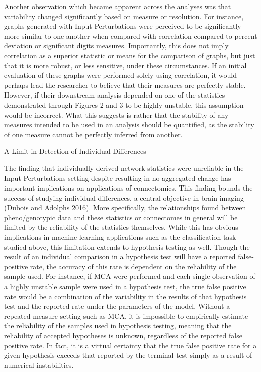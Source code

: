 \documentclass[fleqn,10pt]{SelfArx} %
\begin{document}
Another observation which became apparent across the analyses was that variability changed significantly based on measure or resolution. For instance, graphs generated with Input Perturbations were perceived to be significantly more similar to one another when compared with correlation compared to percent deviation or significant digits measures. Importantly, this does not imply correlation as a superior statistic or means for the comparison of graphs, but just that it is more robust, or less sensitive, under these circumstances. If an initial evaluation of these graphs were performed solely using correlation, it would perhaps lead the researcher to believe that their measures are perfectly stable. However, if their downstream analysis depended on one of the statistics demonstrated through Figures 2 and 3 to be highly unstable, this assumption would be incorrect. What this suggests is rather that the stability of any measures intended to be used in an analysis should be quantified, as the stability of one measure cannot be perfectly inferred from another.

A Limit in Detection of Individual Differences

The finding that individually derived network statistics were unreliable in the Input Perturbations setting despite resulting in no aggregated change has important implications on applications of connectomics. This finding bounds the success of studying individual differences, a central objective in brain imaging (Dubois and Adolphs 2016). More specifically, the relationships found between pheno/genotypic data and these statistics or connectomes in general will be limited by the reliability of the statistics themselves. While this has obvious implications in machine-learning applications such as the classification task studied above, this limitation extends to hypothesis testing as well. Though the result of an individual comparison in a hypothesis test will have a reported false-positive rate, the accuracy of this rate is dependent on the reliability of the sample used. For instance, if MCA were performed and each single observation of a highly unstable sample were used in a hypothesis test, the true false positive rate would be a combination of the variability in the results of that hypothesis test and the reported rate under the parameters of the model. Without a repeated-measure setting such as MCA, it is impossible to empirically estimate the reliability of the samples used in hypothesis testing, meaning that the reliability of accepted hypotheses is unknown, regardless of the reported false positive rate. In fact, it is a virtual certainty that the true false positive rate for a given hypothesis exceeds that reported by the terminal test simply as a result of numerical instabilities.
\end{document}
